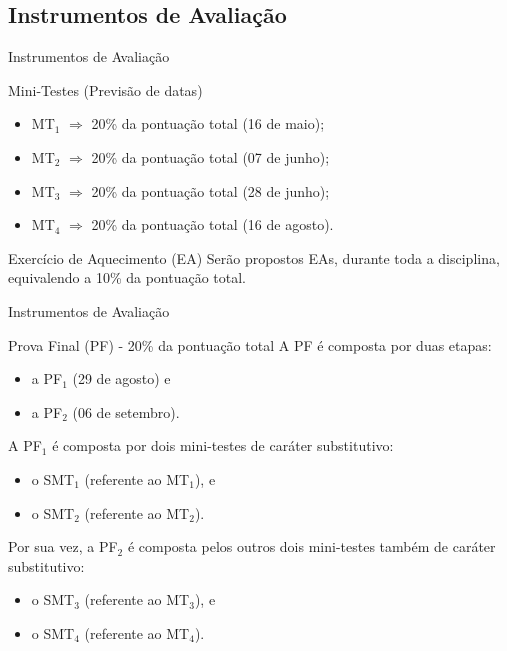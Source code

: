 \documentclass[xcolor=dvipsnames,table]{beamer}
\begin{document}
	\subsection{Instrumentos de Avaliação}
	\begin{frame}{Instrumentos de Avaliação}
		\begin{block}{Mini-Testes (Previsão de datas)}
			\begin{itemize}
				\item MT$_1$ $\Rightarrow$ 20\% da pontuação total (16 de maio);
				\item MT$_2$ $\Rightarrow$ 20\% da pontuação total (07 de junho);
				\item MT$_3$ $\Rightarrow$ 20\% da pontuação total (28 de junho);
				\item MT$_4$ $\Rightarrow$  20\% da pontuação total (16 de agosto).
			\end{itemize}
		\end{block} \pause
		\begin{block}{Exercício de Aquecimento (EA)}
			Serão propostos EAs, durante toda a disciplina, equivalendo a 10\% da pontuação total.
		\end{block}
	\end{frame}
	
	\begin{frame}{Instrumentos de Avaliação}
		\begin{block}{Prova Final (PF) - 20\% da pontuação total}
			A PF é composta por duas etapas: \pause
			\begin{itemize}
				\item a PF$_1$ (29 de agosto) e
				\item a PF$_2$ (06 de setembro).
			\end{itemize}  \pause
			A PF$_1$ é composta por dois mini-testes de caráter substitutivo: \pause 
			\begin{itemize}
				\item o SMT$_1$ (referente ao MT$_1$), e 
				\item o SMT$_2$ (referente ao MT$_2$).
			\end{itemize} \pause
			Por sua vez, a PF$_2$ é composta pelos outros dois mini-testes também de caráter substitutivo:  \pause
			\begin{itemize}
				\item o SMT$_3$ (referente ao MT$_3$), e 
				\item o SMT$_4$ (referente ao MT$_4$).
			\end{itemize}
		\end{block}
	\end{frame}
	
\end{document}
